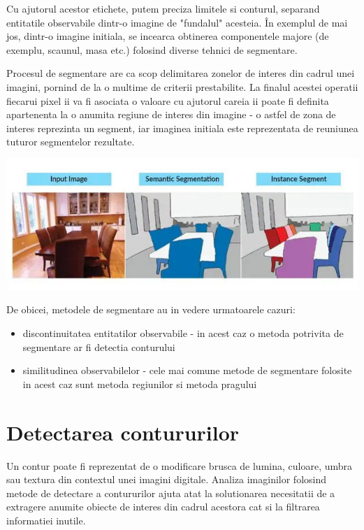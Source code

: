 \documentclass[10pt]{article}
\begin{document}
\> Cu ajutorul acestor etichete, putem preciza limitele si conturul, separand entitatile observabile
dintr-o imagine de "fundalul" acesteia. În exemplul de mai jos, dintr-o imagine initiala,
se incearca obtinerea componentele majore (de exemplu, scaunul, masa etc.) folosind diverse tehnici de segmentare.

\> Procesul de segmentare are ca scop delimitarea zonelor de interes din cadrul unei imagini, 
pornind de la o multime de criterii prestabilite. La finalul acestei operatii fiecarui pixel
ii va fi asociata o valoare cu ajutorul careia ii poate fi definita apartenenta la o anumita regiune de interes
din imagine - o astfel de zona de interes reprezinta un segment, iar imaginea initiala este reprezentata de reuniunea
tuturor segmentelor rezultate.

\begin{center}

  \includegraphics[scale=0.5]{segmentation}
  
\end{center}

\> De obicei, metodele de segmentare au in vedere urmatoarele cazuri:

\begin{itemize}

	\item discontinuitatea entitatilor observabile - in acest caz o metoda potrivita de segmentare ar fi detectia conturului
	\item similitudinea observabilelor - cele mai comune metode de segmentare folosite in acest caz sunt metoda regiunilor si metoda pragului

\end{itemize}

\newpage

\section{Detectarea contururilor}

\> Un contur poate fi reprezentat de o modificare brusca de lumina, culoare, umbra sau
textura din contextul unei imagini digitale. Analiza imaginilor folosind metode de
detectare a contururilor ajuta atat la solutionarea necesitatii de a extragere anumite obiecte
de interes din cadrul acestora cat si la filtrarea informatiei inutile.
\end{document}
